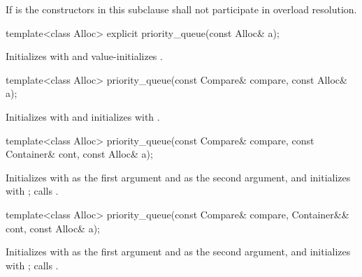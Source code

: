 \documentclass{wg21}
\begin{document}
\pnum
If  is 
the constructors in this subclause shall not participate in overload resolution.

%
\begin{itemdecl}
    template<class Alloc> explicit priority_queue(const Alloc& a);
\end{itemdecl}

\begin{itemdescr}
    \pnum
    \effects
    Initializes  with  and value-initializes .
\end{itemdescr}

%
\begin{itemdecl}
    template<class Alloc> priority_queue(const Compare& compare, const Alloc& a);
\end{itemdecl}

\begin{itemdescr}
    \pnum
    \effects
    Initializes  with  and initializes  with .
\end{itemdescr}

%
\begin{itemdecl}
    template<class Alloc>
    priority_queue(const Compare& compare, const Container& cont, const Alloc& a);
\end{itemdecl}

\begin{itemdescr}
    \pnum
    \effects
    Initializes  with  as the first argument and  as the second
    argument, and initializes  with ;
    calls .
\end{itemdescr}

%
\begin{itemdecl}
    template<class Alloc>
    priority_queue(const Compare& compare, Container&& cont, const Alloc& a);
\end{itemdecl}

\begin{itemdescr}
    \pnum
    \effects
    Initializes  with  as the first argument and 
    as the second argument, and initializes  with ;
    calls .
\end{itemdescr}
\end{document}
